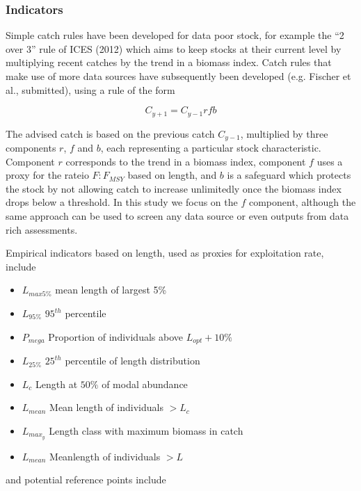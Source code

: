 \documentclass[12pt,doublespacing,a4paper]{ouparticle}
\begin{document}
\subsubsection{Indicators}




Simple catch rules have been developed for data poor stock, for example the “2 over 3” rule  of ICES (2012) which aims to keep stocks at their current level by multiplying recent catches by the trend in a biomass index. Catch rules that make use of more data sources have subsequently been developed (e.g. Fischer et al., submitted), using a rule of the form

\begin{equation} C_{y+1} = C_{y-1}rfb \end{equation}

The advised catch is based on the previous catch $C_{y-1}$, multiplied by three components $r$, $f$ and $b$, each representing a particular stock characteristic. Component $r$ corresponds to the trend in a biomass index, component $f$ uses a proxy  for the rateio $F:F_{MSY}$ based on length, and $b$ is a safeguard which protects the stock by not allowing catch to increase unlimitedly once the biomass index drops below a threshold. In this study we focus on the $f$ component, although the same approach can be used to screen any data source or even outputs from data rich assessments.

Empirical indicators based on length, used as proxies for exploitation rate, include

\begin{itemize}
 \item $L_{max5\%}$ mean length of largest 5\%
 \item  $L_{95\%}$ $95^{th}$ percentile
 \item  $P_{mega}$ Proportion of individuals above $L_{opt} + 10\%$
 \item  $L_{25\%}$ $25^{th}$ percentile of length distribution
 \item  $L_{c}$ Length at $50\%$ of modal abundance
 \item  $L_{mean}$ Mean length of individuals $> L_c$
 \item  $L_{max_{y}}$ Length class with maximum biomass in catch
 \item  $L_{mean}$ Meanlength of individuals $> L$
\end{itemize}

and potential reference points include
\end{document}
